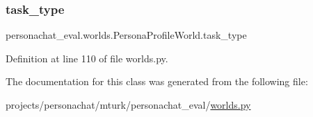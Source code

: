 \subsubsection{\texorpdfstring{task\+\_\+type}{task\_type}}
{\footnotesize\ttfamily personachat\+\_\+eval.\+worlds.\+Persona\+Profile\+World.\+task\+\_\+type}



Definition at line 110 of file worlds.\+py.



The documentation for this class was generated from the following file\+:\begin{DoxyCompactItemize}
\item 
projects/personachat/mturk/personachat\+\_\+eval/\hyperlink{projects_2personachat_2mturk_2personachat__eval_2worlds_8py}{worlds.\+py}\end{DoxyCompactItemize}
